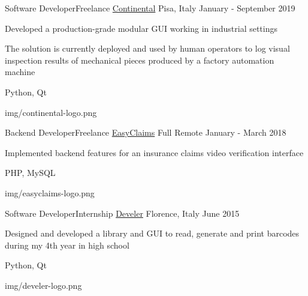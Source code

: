\begin{cventries}
  \logocventry
    {Software Developer{\enskip\cdotp\enskip}Freelance}
    {\href{https://www.continental-pneumatici.it/auto}{Continental}}
    {Pisa, Italy}
    {January - September 2019}
    {
      \begin{cvitems}
        \item {Developed a production-grade modular GUI working in industrial settings}
        \item {The solution is currently deployed and used by human operators to log visual inspection results of mechanical pieces produced by a factory automation machine}
      \end{cvitems}
      \cvexptech
        {Python, Qt}
    }
    {img/continental-logo.png}

  \logocventry
    {Backend Developer{\enskip\cdotp\enskip}Freelance}
    {\href{https://www.easyclaims.eu}{EasyClaims}}
    {Full Remote}
    {January - March 2018}
    {
      \begin{cvitems}
        \item {Implemented backend features for an insurance claims video verification interface}
      \end{cvitems}
      \cvexptech
        {PHP, MySQL}
    }
    {img/easyclaims-logo.png}

  \logocventry
    {Software Developer{\enskip\cdotp\enskip}Internship}
    {\href{https://www.develer.com/}{Develer}}
    {Florence, Italy}
    {June 2015}
    {
    \begin{cvitems}
      \item {Designed and developed a library and GUI to read, generate and print barcodes during my 4th year in high school}
    \end{cvitems}
    \cvexptech
      {Python, Qt}
    }
    {img/develer-logo.png}

\end{cventries}